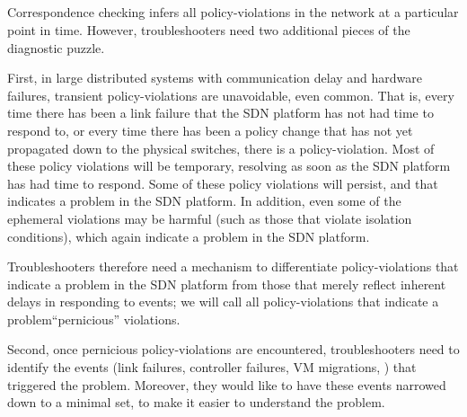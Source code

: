 \subsection{\SIMULATOR{}}
\label{sec:causal_analysis}




Correspondence checking infers all policy-violations in the network at a
particular point in time. However, troubleshooters
need two additional pieces of the diagnostic puzzle.

First, in large distributed
systems with communication delay and hardware failures, transient policy-violations
are unavoidable, even common. That is, every time there has been a link failure that the SDN platform has not had time to respond to, or every time there has been a policy change that has not yet propagated down to the physical switches, there is a policy-violation.  Most of these policy violations will be temporary, resolving as soon as the SDN platform has had time to respond.  Some of these policy violations will persist, and that indicates a problem in the SDN platform.  In addition, even some of the ephemeral violations may be harmful (such as those that violate isolation conditions), which again indicate a problem in the SDN platform.

Troubleshooters therefore need a mechanism to differentiate
policy-violations that indicate a problem in the SDN platform from those that merely reflect inherent delays in responding to events; we will call all policy-violations that indicate a problem``pernicious'' violations.

Second, once pernicious policy-violations are encountered, troubleshooters need to
identify the events (link failures, controller failures, VM migrations,
\etc{}) that triggered the problem. Moreover, they would like to have these events narrowed down to a minimal set, to make it easier to understand the problem.

